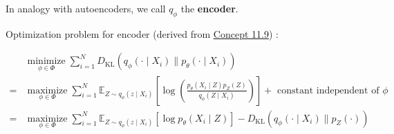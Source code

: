 \begin{concept}
    In analogy with autoencoders, we call $q_{\phi}$ the \textbf{encoder}.

    Optimization problem for encoder (derived from \hyperref[concept:11.9]{Concept 11.9}) :

    $$
    \begin{aligned}
    & \underset{\phi \in \Phi}{\operatorname{minimize}} \sum_{i=1}^{N} D_{\mathrm{KL}}\left(q_{\phi}\left(\cdot \mid X_{i}\right) \| p_{\theta}\left(\cdot \mid X_{i}\right)\right) \\
    = & \underset{\phi \in \Phi}{\operatorname{maximize}} \sum_{i=1}^{N} \mathbb{E}_{Z \sim q_{\phi}\left(z \mid X_{i}\right)}\left[\log \left(\frac{p_{\theta}\left(X_{i} \mid Z\right) p_{Z}(Z)}{q_{\phi}\left(Z \mid X_{i}\right)}\right)\right]+\text { constant independent of } \phi \\
    = & \underset{\phi \in \Phi}{\operatorname{maximize}} \sum_{i=1}^{N} \mathbb{E}_{Z \sim q_{\phi}\left(z \mid X_{i}\right)}\left[\log p_{\theta}\left(X_{i} \mid Z\right)\right]-D_{\mathrm{KL}}\left(q_{\phi}\left(\cdot \mid X_{i}\right) \| p_{Z}(\cdot)\right)
    \end{aligned}
    $$
\end{concept}

